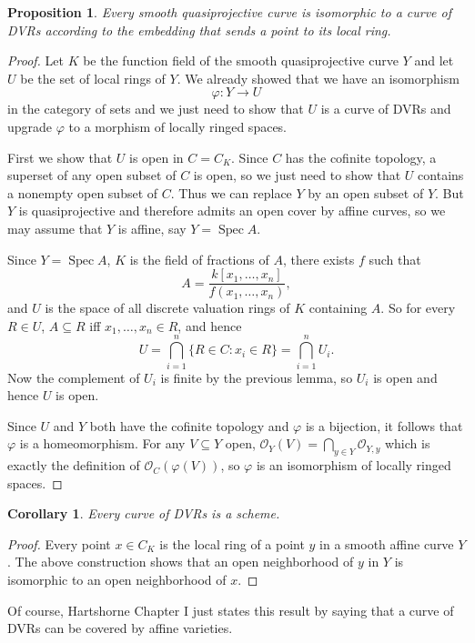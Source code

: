 \documentclass[reqno,12pt,letterpaper]{amsart}
\DeclareMathOperator{\Spec}{Spec}
\newcommand{\Olo}{\mathscr O}
\newtheorem{proposition}[theorem]{Proposition}
\newtheorem{corollary}[theorem]{Corollary}
\theoremstyle{definition}
\begin{document}
\begin{proposition}
Every smooth quasiprojective curve is isomorphic to a curve of DVRs according to the embedding that sends a point to its local ring.
\end{proposition}
\begin{proof}
Let $K$ be the function field of the smooth quasiprojective curve $Y$ and let $U$ be the set of local rings of $Y$.
We already showed that we have an isomorphism
$$\varphi: Y \to U$$
in the category of sets and we just need to show that $U$ is a curve of DVRs and upgrade $\varphi$ to a morphism of locally ringed spaces.

First we show that $U$ is open in $C = C_K$.
Since $C$ has the cofinite topology, a superset of any open subset of $C$ is open, so we just need to show that $U$ contains a nonempty open subset of $C$.
Thus we can replace $Y$ by an open subset of $Y$.
But $Y$ is quasiprojective and therefore admits an open cover by affine curves, so we may assume that $Y$ is affine, say $Y = \Spec A$.

Since $Y = \Spec A$, $K$ is the field of fractions of $A$, there exists $f$ such that
$$A = \frac{k[x_1, \dots, x_n]}{f(x_1, \dots, x_n)},$$
and $U$ is the space of all discrete valuation rings of $K$ containing $A$.
So for every $R \in U$, $A \subseteq R$ iff $x_1, \dots, x_n \in R$, and hence
$$U = \bigcap_{i=1}^n \{R \in C: x_i \in R\} = \bigcap_{i=1}^n U_i.$$
Now the complement of $U_i$ is finite by the previous lemma, so $U_i$ is open and hence $U$ is open.

Since $U$ and $Y$ both have the cofinite topology and $\varphi$ is a bijection, it follows that $\varphi$ is a homeomorphism.
For any $V \subseteq Y$ open, $\Olo_Y(V) = \bigcap_{y \in Y} \Olo_{Y,y}$ which is exactly the definition of $\Olo_C(\varphi(V))$, so $\varphi$ is an isomorphism of locally ringed spaces.
\end{proof}

\begin{corollary}
Every curve of DVRs is a scheme.
\end{corollary}
\begin{proof}
Every point $x \in C_K$ is the local ring of a point $y$ in a smooth affine curve $Y$.
The above construction shows that an open neighborhood of $y$ in $Y$ is isomorphic to an open neighborhood of $x$.
\end{proof}

Of course, Hartshorne Chapter I just states this result by saying that a curve of DVRs can be covered by affine varieties.
\end{document}
